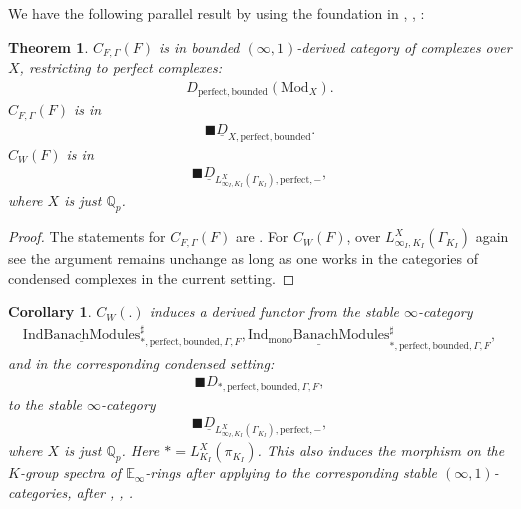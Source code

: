 \documentclass[12pt]{article}
\newtheorem{theorem}{Theorem}
\newtheorem{corollary}{Corollary}
\theoremstyle{definition}
\begin{document}
We have the following parallel result by using the foundation in \cite{CS1}, \cite{CS2}, \cite{CS3}:


\begin{theorem}
$C_{F,\Gamma}(F)$ is in bounded $(\infty,1)$-derived category of complexes over $X$, restricting to perfect complexes:
\begin{align}
D_{\mathrm{perfect},\mathrm{bounded}}(\mathrm{Mod}_X).
\end{align}
$C_{F,\Gamma}(F)$ is in 
\begin{align}
\blacksquare\underline{D}_{X,\mathrm{perfect},\mathrm{bounded}}.
\end{align} 
$C_{W}(F)$ is in 
\begin{align}
\blacksquare\underline{D}_{L^X_{\infty_I,K_I}(\Gamma_{K_I}),\mathrm{perfect},-},
\end{align}
where $X$ is just $\mathbb{Q}_p$.
\end{theorem}

\begin{proof}
The statements for $C_{F,\Gamma}(F)$ are \cite{T}. For $C_{W}(F)$, over $L^X_{\infty_I,K_I}(\Gamma_{K_I})$ again see \cite{T} the argument remains unchange as long as one works in the categories of condensed complexes in the current setting.
\end{proof}

\begin{corollary}
$C_{W}(.)$ induces a derived functor from the stable $\infty$-category 
\begin{align}
\underline{\mathrm{IndBanachModules}}^\sharp_{*,\mathrm{perfect},\mathrm{bounded},\Gamma,F}, \underline{\mathrm{Ind_{\mathrm{mono}}BanachModules}}^\sharp_{*,\mathrm{perfect},\mathrm{bounded},\Gamma,F},
\end{align}
and in the corresponding condensed setting:
\begin{align}
\blacksquare D_{*,\mathrm{perfect},\mathrm{bounded},\Gamma,F},
\end{align}
to the stable $\infty$-category 
\begin{align}
\blacksquare\underline{D}_{L^X_{\infty_I,K_I}(\Gamma_{K_I}),\mathrm{perfect},-},
\end{align}
where $X$ is just $\mathbb{Q}_p$. Here $*=L_{K_I}^X(\pi_{K_I})$. This also induces the morphism on the $K$-group spectra of $\mathbb{E}_\infty$-rings after applying \cite{BGT} to the corresponding stable $(\infty,1)$-categories, after \cite{G2}, \cite{A2}, \cite{BGT}.
\end{corollary}
\end{document}
